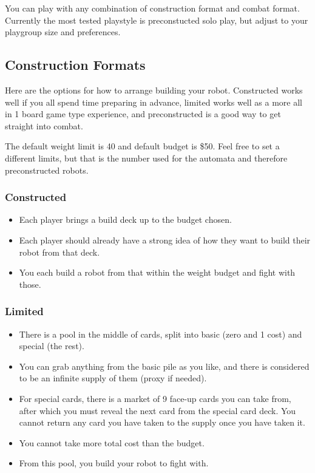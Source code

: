 \documentclass[11pt,a4paper]{article}
\begin{document}
You can play with any combination of construction format and combat format.
Currently the most tested playstyle is preconstucted solo play, but adjust to your
playgroup size and preferences.

\subsection{Construction Formats}
Here are the options for how to arrange building your robot.
Constructed works well if you all spend time preparing in advance,
limited works well as a more all in 1 board game type experience, 
and preconstructed is a good way to get straight into combat.

The default weight limit is 40 and default budget is \$50.
Feel free to set a different limits, but that is the number used for the automata and therefore preconstructed robots. 

\subsubsection{Constructed}

\begin{itemize}[itemsep=1pt, topsep=0.5pt, parsep=0pt]
  \item Each player brings a build deck up to the budget chosen.
  \item Each player should already have a strong idea of how they want to build their robot from that deck.
  \item You each build a robot from that within the weight budget and fight with those.
\end{itemize}

\subsubsection{Limited}

\begin{itemize}[itemsep=1pt, topsep=0.5pt, parsep=0pt]
  \item There is a pool in the middle of cards, split into basic (zero and 1 cost) and special (the rest).
  \item You can grab anything from the basic pile as you like, and there is considered to be an infinite supply of them (proxy if needed).
  \item For special cards, there is a market of 9 face-up cards you can take from, after which you must reveal the next card from the special card deck. You cannot return any card you have taken to the supply once you have taken it.
  \item You cannot take more total cost than the budget.
  \item From this pool, you build your robot to fight with.
\end{itemize}
\end{document}
